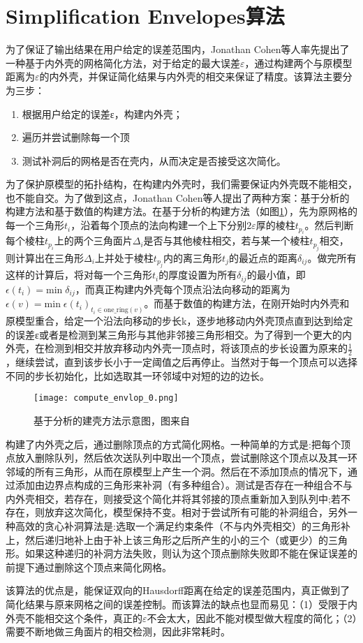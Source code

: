 \section{Simplification Envelopes算法}
为了保证了输出结果在用户给定的误差范围内，Jonathan Cohen等人率先提出了一种基于内外壳的网格简化方法\cite{simp-envlop}，对于给定的最大误差$\varepsilon$，通过构建两个与原模型距离为$\varepsilon$的内外壳，并保证简化结果与内外壳的相交来保证了精度。该算法主要分为三步：
\begin{enumerate}
  \item 根据用户给定的误差ε，构建内外壳；
  \item 遍历并尝试删除每一个顶
  \item 测试补洞后的网格是否在壳内，从而决定是否接受这次简化。
\end{enumerate}
为了保护原模型的拓扑结构，在构建内外壳时，我们需要保证内外壳既不能相交，也不能自交。为了做到这点，Jonathan Cohen等人提出了两种方案：基于分析的构建方法和基于数值的构建方法。在基于分析的构建方法（如图\ref{fig:compute-envlop0}），先为原网格的每一个三角形$t_i$，沿着每个顶点的法向构建一个上下分别$2\varepsilon$厚的棱柱$t_{p_i}$。然后判断每个棱柱$t_{p_i}$上的两个三角面片$\Delta_i$是否与其他棱柱相交，若与某一个棱柱$t_{p_j}$相交，则计算出在三角形$\Delta_i$上并处于棱柱$t_{p_j}$内的离三角形$t_j$的最近点的距离$\delta_{ij}$。做完所有这样的计算后，将对每一个三角形$t_i$的厚度设置为所有$\delta_{ij}$的最小值，即$\epsilon(t_i) = \text{min} \; \delta_{ij}$，而真正构建内外壳每个顶点沿法向移动的距离为$\epsilon(v) = \text{min} \; \epsilon(t_i)_{t_i \in  \text{one\_ring}(v)}$。而基于数值的构建方法，在刚开始时内外壳和原模型重合，给定一个沿法向移动的步长k，逐步地移动内外壳顶点直到达到给定的误差ε或者是检测到某三角形与其他非邻接三角形相交。为了得到一个更大的内外壳，在检测到相交并放弃移动内外壳一顶点时，将该顶点的步长设置为原来的$\frac{1}{2}$，继续尝试，直到该步长小于一定阈值之后再停止。当然对于每一个顶点可以选择不同的步长初始化，比如选取其一环邻域中对短的边的边长。\par
\begin{figure}[htbp]
    \centering
    \texttt{[image: compute\_envlop\_0.png]}
    \caption{基于分析的建壳方法示意图，图来自\cite{simp-envlop}}
    \label{fig:compute-envlop0}
\end{figure}
构建了内外壳之后，通过删除顶点的方式简化网格。一种简单的方式是:把每个顶点放入删除队列，然后依次送队列中取出一个顶点，尝试删除这个顶点以及其一环邻域的所有三角形，从而在原模型上产生一个洞。然后在不添加顶点的情况下，通过添加由边界点构成的三角形来补洞（有多种组合）。测试是否存在一种组合不与内外壳相交，若存在，则接受这个简化并将其邻接的顶点重新加入到队列中;若不存在，则放弃这次简化，模型保持不变。相对于尝试所有可能的补洞组合，另外一种高效的贪心补洞算法是:选取一个满足约束条件（不与内外壳相交）的三角形补上，然后递归地补上由于补上该三角形之后所产生的小的三个（或更少）的三角形。如果这种递归的补洞方法失败，则认为这个顶点删除失败即不能在保证误差的前提下通过删除这个顶点来简化网格。\par
该算法的优点是，能保证双向的Hausdorff距离在给定的误差范围内，真正做到了简化结果与原来网格之间的误差控制。而该算法的缺点也显而易见：（1）受限于内外壳不能相交这个条件，真正的$\varepsilon$不会太大，因此不能对模型做大程度的简化；（2）需要不断地做三角面片的相交检测，因此非常耗时。

